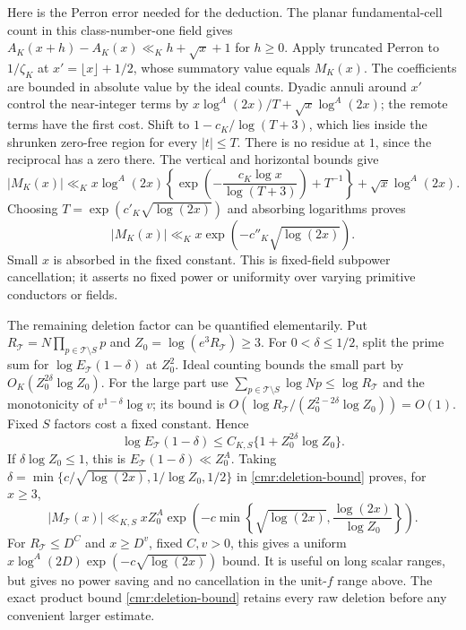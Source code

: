 Here is the Perron error needed for the deduction. The planar
fundamental-cell count in this class-number-one field gives
$A_K(x+h)-A_K(x)\ll_K h+\sqrt x+1$ for $h\ge0$.
Apply truncated Perron to $1/\zeta_K$ at
$x'=\lfloor x\rfloor+1/2$, whose summatory value equals $M_K(x)$.
The coefficients are bounded in absolute value by the ideal counts.
Dyadic annuli around $x'$ control the near-integer terms by
$x\log^A(2x)/T+\sqrt x\log^A(2x)$; the remote terms have the first
cost. Shift to $1-c_K/\log(T+3)$, which lies inside the shrunken
zero-free region for every $|t|\le T$.
There is no residue at $1$, since the reciprocal has a zero there.
The vertical and horizontal bounds give
\[
 |M_K(x)|\ll_K x\log^A(2x)
 \left\{\exp\left(-\frac{c_K\log x}{\log(T+3)}\right)+T^{-1}\right\}
       +\sqrt x\log^A(2x).
\]
Choosing $T=\exp(c'_K\sqrt{\log(2x)})$ and absorbing logarithms proves
\begin{equation}\label{cmr:fixed-mertens}
 |M_K(x)|\ll_K x\exp(-c''_K\sqrt{\log(2x)}).
\end{equation}
Small $x$ is absorbed in the fixed constant. This is fixed-field
subpower cancellation; it asserts no fixed power or uniformity over
varying primitive conductors or fields.

The remaining deletion factor can be quantified elementarily. Put
$R_{\mathcal T}=N\prod_{p\in\mathcal T\setminus S}p$ and
$Z_0=\log(e^3R_{\mathcal T})\ge3$. For $0<\delta\le1/2$, split the
prime sum for $\log E_{\mathcal T}(1-\delta)$ at $Z_0^2$.
Ideal counting bounds the small part by
$O_K(Z_0^{2\delta}\log Z_0)$. For the large part use
$\sum_{p\in\mathcal T\setminus S}\log Np\le\log R_{\mathcal T}$
and the monotonicity of $v^{1-\delta}\log v$; its bound is
$O(\log R_{\mathcal T}/(Z_0^{2-2\delta}\log Z_0))=O(1)$.
Fixed $S$ factors cost a fixed constant. Hence
\[
 \log E_{\mathcal T}(1-\delta)
       \le C_{K,S}\{1+Z_0^{2\delta}\log Z_0\}.
\]
If $\delta\log Z_0\le1$, this is $E_{\mathcal T}(1-\delta)\ll Z_0^A$.
Taking $\delta=\min\{c/\sqrt{\log(2x)},1/\log Z_0,1/2\}$ in
\eqref{cmr:deletion-bound} proves, for $x\ge3$,
\begin{equation}\label{cmr:uniform-mertens}
 |M_{\mathcal T}(x)|\ll_{K,S}xZ_0^A
 \exp\left(-c\min\left\{\sqrt{\log(2x)},
                          \frac{\log(2x)}{\log Z_0}\right\}\right).
\end{equation}
For $R_{\mathcal T}\le D^C$ and $x\ge D^v$, fixed $C,v>0$,
this gives a uniform $x\log^A(2D)\exp(-c\sqrt{\log(2x)})$ bound.
It is useful on long scalar ranges, but gives no power saving and
no cancellation in the unit-$f$ range above. The exact product bound
\eqref{cmr:deletion-bound} retains every raw deletion before any
convenient larger estimate.

